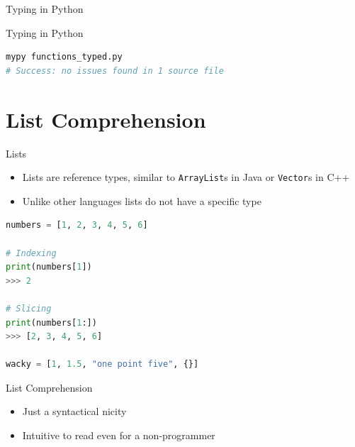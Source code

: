 \documentclass[aspectratio=169,xcolor=dvipsnames]{beamer}
\begin{document}

\begin{frame}[fragile]{Typing in Python}
  \begin{example}
    
  \end{example}
\end{frame}

\begin{frame}[fragile]{Typing in Python}
  \begin{example}
    \begin{lstlisting}[language=bash, otherkeywords={mypy}]
mypy functions_typed.py
# Success: no issues found in 1 source file
    \end{lstlisting}
  \end{example}
\end{frame}



\section{List Comprehension}

\begin{frame}[fragile]{Lists}
  \begin{itemize}
    \item Lists are reference types, similar to \texttt{ArrayList}s in Java or \texttt{Vector}s in C++
    \item Unlike other languages lists do not have a specific type
  \end{itemize}
  \begin{example}
    \begin{lstlisting}[language=Python]
numbers = [1, 2, 3, 4, 5, 6]

# Indexing
print(numbers[1])
>>> 2

# Slicing
print(numbers[1:])
>>> [2, 3, 4, 5, 6]

wacky = [1, 1.5, "one point five", {}]
    \end{lstlisting}
  \end{example}
\end{frame}


\begin{frame}{List Comprehension}
  \begin{itemize}
    \item Just a syntactical nicity
    \item Intuitive to read even for a non-programmer
    \begin{example}
      
    \end{example}
  \end{itemize}
\end{frame}
\end{document}
